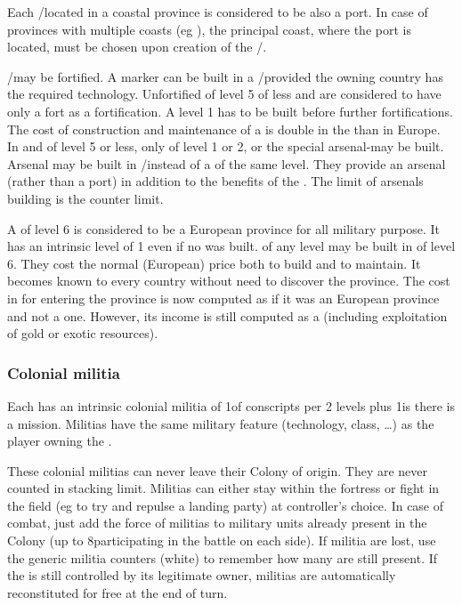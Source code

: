  Each \COL/\TP located in a coastal province
is considered to be also a port.
\bparag In case of provinces with multiple coasts (eg ),
the principal coast, where the port is located, must be chosen upon creation
of the \COL/\TP.

\aparag[Fortifications] \COL/\TP may be fortified. A \fortress marker can be
built in a \COL/\TP provided the owning country has the required technology.
\bparag Unfortified \COL of level 5 of less and \TP are considered to have
only a fort as a fortification. A level 1 \fortress has to be built before
further fortifications.
\bparag The cost of construction and maintenance of a \fortress is double in
the \ROTW than in Europe.
\bparag In \TP and \COL of level 5 or less, only \fortress of level 1 or 2, or
the special arsenal-\fortress may be built.
\bparag Arsenal may be built in \COL/\TP instead of a \fortress of the same
level. They provide an arsenal (rather than a port) in addition to the
benefits of the \fortress. The limit of arsenals building is the counter
limit.

 A \COL of level 6 is considered to be a European
province for all military purpose.
\bparag It has an intrinsic \fortress level of 1 even if no \fortress was
built.
\bparag \fortress of any level may be built in \COL of level 6. They cost the
normal (European) price both to build and to maintain.
\bparag It becomes known to every country without need to discover the
province.
\bparag The cost in \MP for entering the province is now computed as if it was
an European province and not a \ROTW one.
\bparag However, its income is still computed as a \COL (including
exploitation of gold or exotic resources).


\subsubsection{Colonial militia}
\aparag Each \COL has an intrinsic colonial militia of 1\LDE of conscripts per
2 levels plus 1\LDE is there is a mission.
\bparag Militias have the same military feature (technology, class, \ldots) as
the player owning the \COL.

 These colonial militias can never leave their
Colony of origin. They are never counted in stacking limit.
\bparag Militias can either stay within the fortress or fight in the field (eg
to try and repulse a landing party) at controller's choice.
\bparag In case of combat, just add the force of militias to military units
already present in the Colony (up to 8\LD participating in the battle on each
side).
\bparag If militia are lost, use the generic militia counters (white) to
remember how many \LDE are still present.
\bparag If the \COL is still controlled by its legitimate owner, militias are
automatically reconstituted for free at the end of turn.


